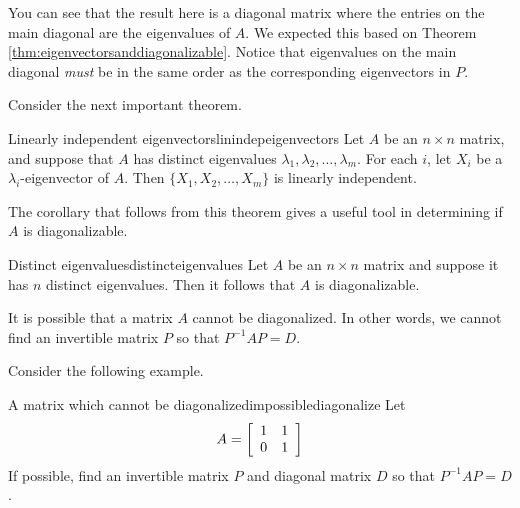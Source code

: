 \begin{solution}
You can see that the result here is a diagonal matrix where the entries on the main diagonal are the eigenvalues of $A$. We expected this based on 
Theorem \ref{thm:eigenvectorsanddiagonalizable}. Notice that eigenvalues on the main diagonal {\em must\em} be in the same order as the corresponding eigenvectors in $P$. 
\end{solution}

Consider the next important theorem.

\begin{theorem}{Linearly independent eigenvectors}{linindepeigenvectors}
Let $A$ be an $n\times n$ matrix, and suppose that $A$ 
has distinct eigenvalues $\lambda_1, \lambda_2, \ldots, \lambda_m$.
For each $i$, let $X_i$ be a $\lambda_i$-eigenvector of $A$.
Then $\{ X_1, X_2, \ldots, X_m\}$ is 
linearly independent.
\end{theorem}

The corollary that follows from this theorem gives a useful tool in determining if $A$ is diagonalizable. 

\begin{corollary}{Distinct eigenvalues}{distincteigenvalues}
Let $A$ be an $n \times n$ matrix and suppose it has $n$ distinct eigenvalues. Then it follows that $A$ is diagonalizable.
\end{corollary}

It is possible that a matrix $A$ cannot be diagonalized. In other words, we cannot find an invertible matrix $P$ so that $P^{-1}AP=D$.

Consider the following example. 

\begin{example}{A matrix which cannot be diagonalized}{impossiblediagonalize}
Let
\begin{equation*}
A = 
\left[
\begin{array}{rr}
1 & 1 \\
0 & 1
\end{array}
\right]
\end{equation*}
If possible, find an invertible matrix $P$ and diagonal matrix $D$ so that $P^{-1}AP=D$.
\end{example}

